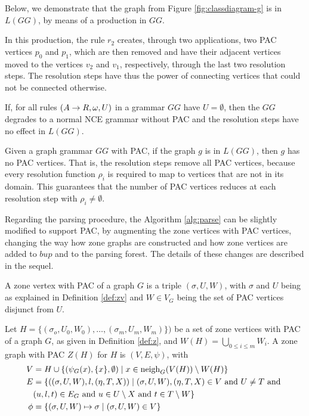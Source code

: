 \documentclass[]{report}
\begin{document}


Below, we demonstrate that the graph from Figure \ref{fig:classdiagram-g} is in $L(GG)$, by means of a production in $GG$.


In this production, the rule $r_2$ creates, through two applications, two PAC vertices $p_0$ and $p_1$, which are then removed and have their adjacent vertices moved to the vertices $v_2$ and $v_1$, respectively, through the last two resolution steps. The resolution steps have thus the power of connecting vertices that could not be connected otherwise.


\begin{remark}
	If, for all rules $(A \to R,\omega,U)$ in a grammar $GG$ have $U = \emptyset$, then the $GG$ degrades to a normal NCE grammar without PAC and the resolution steps have no effect in $L(GG)$.
\end{remark}

\begin{remark}
	Given a graph grammar $GG$ with PAC, if the graph $g$ is in $L(GG)$, then $g$ has no PAC vertices. That is, the resolution steps remove all PAC vertices, because every resolution function $\rho_i$ is required to map to vertices that are not in its domain. This guarantees that the number of PAC vertices reduces at each resolution step with $\rho_i \neq \emptyset$.
\end{remark}

Regarding the parsing procedure, the Algorithm \ref{alg:parse} can be slightly modified to support PAC, by augmenting the zone vertices with PAC vertices, changing the way how zone graphs are constructed and how zone vertices are added to $bup$ and to the parsing forest. The details of these changes are described in the sequel.

\begin{definition}
	A zone vertex with PAC of a graph $G$ is a triple $(\sigma, U, W)$, with $\sigma$ and $U$ being as explained in Definition \ref{def:zv} and $W \in V_G$ being the set of PAC vertices disjunct from $U$.
\end{definition}

\begin{definition}
	Let $H = \{(\sigma_o,U_0,W_0), \dots, (\sigma_m, U_m, W_m)\})$ be a set of zone vertices with PAC of a graph $G$, as given in Definition \ref{def:z}, and $W(H) = \bigcup_{0 \le i \le m}{W_i}$. A zone graph with PAC $Z(H)$ for $H$ is $(V,E,\psi)$, with
	\begin{align*}
		V & = H \cup \{(\psi_G(x),\{x\}, \emptyset) \; | \; x \in \operatorname{neigh}_{G}(V(H)) \setminus W(H) \} \\
		E & = \{((\sigma,U,W),l,(\eta,T,X)) \; | \; (\sigma,U,W),(\eta,T,X) \in V \text{ and } U \neq T \text{ and } \\
		& (u,l,t) \in E_G \text{ and } u \in U \setminus X \text{ and } t \in T \setminus W \} \\
		\phi & = \{(\sigma,U,W) \mapsto \sigma \; | \; (\sigma,U,W) \in V\}
	\end{align*}
\end{definition}
\end{document}
